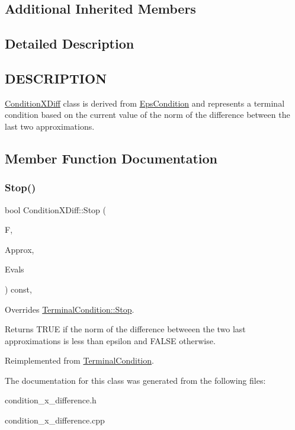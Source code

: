\subsection*{Additional Inherited Members}


\subsection{Detailed Description}
\hypertarget{function_8h_DESCRIPTION}{}\subsection{D\+E\+S\+C\+R\+I\+P\+T\+I\+ON}\label{function_8h_DESCRIPTION}
\hyperlink{class_condition_x_diff}{Condition\+X\+Diff} class is derived from \hyperlink{class_eps_condition}{Eps\+Condition} and represents a terminal condition based on the current value of the norm of the difference between the last two approximations. 

\subsection{Member Function Documentation}
\mbox{\label{class_condition_x_diff_a375e80eb4b88db5c2823a7d4efe20972}} 
\subsubsection{\texorpdfstring{Stop()}{Stop()}}
{\footnotesize\ttfamily bool Condition\+X\+Diff\+::\+Stop (\begin{DoxyParamCaption}\item[{std\+::shared\+\_\+ptr$<$ \hyperlink{class_function}{Function} $>$}]{F,  }\item[{const std\+::vector$<$ \hyperlink{classv_point}{v\+Point} $>$ \&}]{Approx,  }\item[{const std\+::vector$<$ double $>$ \&}]{Evals }\end{DoxyParamCaption}) const\hspace{0.3cm}{\ttfamily [override]}, {\ttfamily [virtual]}}

Overrides \hyperlink{class_terminal_condition_ad6294bf2bd6f5e2c6164e461c24d3198}{Terminal\+Condition\+::\+Stop}. \begin{DoxyReturn}{Returns}
T\+R\+UE if the norm of the difference betweeen the two last approximations is less than epsilon and F\+A\+L\+SE otherwise. 
\end{DoxyReturn}


Reimplemented from \hyperlink{class_terminal_condition_ad6294bf2bd6f5e2c6164e461c24d3198}{Terminal\+Condition}.



The documentation for this class was generated from the following files\+:\begin{DoxyCompactItemize}
\item 
condition\+\_\+x\+\_\+difference.\+h\item 
condition\+\_\+x\+\_\+difference.\+cpp\end{DoxyCompactItemize}
